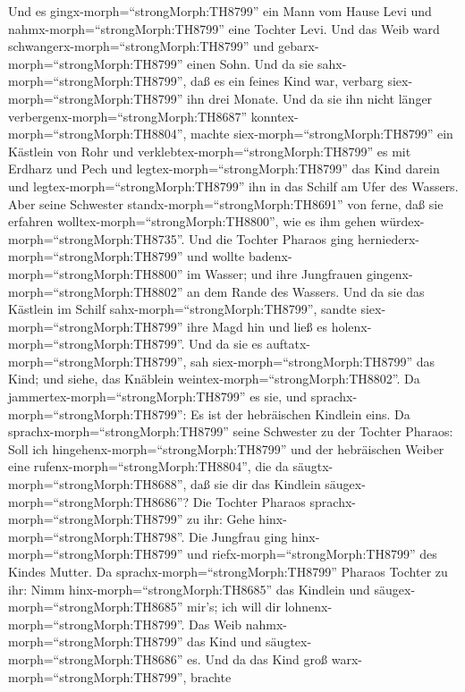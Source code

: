  Und es gingx-morph=``strongMorph:TH8799'' ein Mann vom
Hause Levi und nahmx-morph=``strongMorph:TH8799'' eine Tochter Levi.
 Und das Weib ward schwangerx-morph=``strongMorph:TH8799''
und gebarx-morph=``strongMorph:TH8799'' einen Sohn. Und da sie
sahx-morph=``strongMorph:TH8799'', daß es ein feines Kind war, verbarg
siex-morph=``strongMorph:TH8799'' ihn drei Monate.  Und da
sie ihn nicht länger verbergenx-morph=``strongMorph:TH8687''
konntex-morph=``strongMorph:TH8804'', machte
siex-morph=``strongMorph:TH8799'' ein Kästlein von Rohr und
verklebtex-morph=``strongMorph:TH8799'' es mit Erdharz und Pech und
legtex-morph=``strongMorph:TH8799'' das Kind darein und
legtex-morph=``strongMorph:TH8799'' ihn in das Schilf am Ufer des
Wassers.  Aber seine Schwester
standx-morph=``strongMorph:TH8691'' von ferne, daß sie erfahren
wolltex-morph=``strongMorph:TH8800'', wie es ihm gehen
würdex-morph=``strongMorph:TH8735''.  Und die Tochter
Pharaos ging herniederx-morph=``strongMorph:TH8799'' und wollte
badenx-morph=``strongMorph:TH8800'' im Wasser; und ihre Jungfrauen
gingenx-morph=``strongMorph:TH8802'' an dem Rande des Wassers. Und da
sie das Kästlein im Schilf sahx-morph=``strongMorph:TH8799'', sandte
siex-morph=``strongMorph:TH8799'' ihre Magd hin und ließ es
holenx-morph=``strongMorph:TH8799''.  Und da sie es
auftatx-morph=``strongMorph:TH8799'', sah
siex-morph=``strongMorph:TH8799'' das Kind; und siehe, das Knäblein
weintex-morph=``strongMorph:TH8802''. Da
jammertex-morph=``strongMorph:TH8799'' es sie, und
sprachx-morph=``strongMorph:TH8799'': Es ist der hebräischen Kindlein
eins.  Da sprachx-morph=``strongMorph:TH8799'' seine
Schwester zu der Tochter Pharaos: Soll ich
hingehenx-morph=``strongMorph:TH8799'' und der hebräischen Weiber eine
rufenx-morph=``strongMorph:TH8804'', die da
säugtx-morph=``strongMorph:TH8688'', daß sie dir das Kindlein
säugex-morph=``strongMorph:TH8686''?  Die Tochter Pharaos
sprachx-morph=``strongMorph:TH8799'' zu ihr: Gehe
hinx-morph=``strongMorph:TH8798''. Die Jungfrau ging
hinx-morph=``strongMorph:TH8799'' und riefx-morph=``strongMorph:TH8799''
des Kindes Mutter.  Da sprachx-morph=``strongMorph:TH8799''
Pharaos Tochter zu ihr: Nimm hinx-morph=``strongMorph:TH8685'' das
Kindlein und säugex-morph=``strongMorph:TH8685'' mir's; ich will dir
lohnenx-morph=``strongMorph:TH8799''. Das Weib
nahmx-morph=``strongMorph:TH8799'' das Kind und
säugtex-morph=``strongMorph:TH8686'' es.  Und da das Kind
groß warx-morph=``strongMorph:TH8799'', brachte
